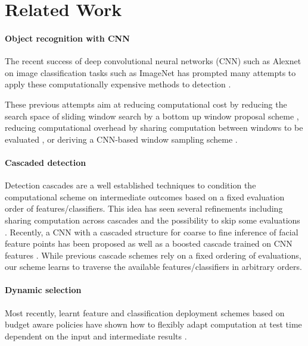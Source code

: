 \section{Related Work}\label{sec:related}

\paragraph{Object recognition with CNN}\label{object-recognition-with-cnn}

The recent success of deep convolutional neural networks (CNN) such as Alexnet \cite{Krizhevsky-NIPS-2012} on image classification tasks such as ImageNet \cite{Deng-CVPR-2009} has prompted many attempts to apply these computationally expensive methods to detection \cite{Girshick-CVPR-2014,Zou-BMVC-2014,Simonyan-ICLR-2014,Erhan-CVPR-2014,Sermanet-ICLR-2014,He-ECCV-2014} .

These previous attempts aim at reducing computational cost by reducing the search space of sliding window search by a bottom up window proposal scheme \cite{Girshick-CVPR-2014}, reducing computational overhead by sharing computation between windows to be evaluated \cite{Zou-BMVC-2014,Sermanet-ICLR-2014}, or deriving a CNN-based window sampling scheme \cite{Simonyan-ICLR-2014}.

\paragraph{Cascaded detection}\label{cascaded-detection}
Detection cascades \cite{Viola-IJCV-2004,Felzenszwalb-CVPR-2010} are a well established techniques to condition the computational scheme on intermediate outcomes based on a fixed evaluation order of features/classifiers.
This idea has seen several refinements including sharing computation across cascades \cite{Dollar-ECCV-2012} and the possibility to skip some evaluations \cite{Benbouzid-ICML-2012}.
Recently, a CNN with a cascaded structure for coarse to fine inference of facial feature points has been proposed \cite{Sun-CVPR-2013} as well as a boosted cascade trained on CNN features \cite{Zou-BMVC-2014}. While previous cascade schemes rely on a fixed ordering of evaluations, our scheme learns to traverse the available features/classifiers in arbitrary orders.

\paragraph{Dynamic selection}\label{dynamic-selection}
Most recently, learnt feature and classification deployment schemes based on budget aware policies have shown how to flexibly adapt computation at test time dependent on the input and intermediate results \cite{Karayev-NIPS-2012,DulacArnold-ICLR-2014}.
